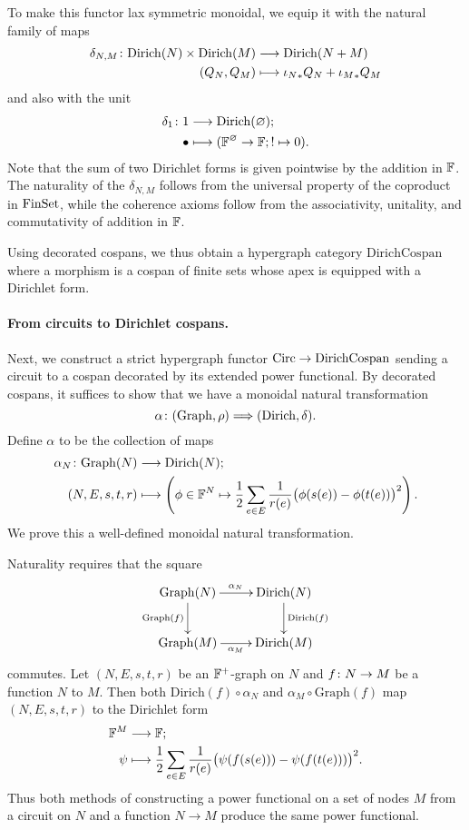 To make this functor lax symmetric monoidal, we equip it with the natural family of maps
\begin{align*}
  \delta_{N,M}{\colon} \mathrm{Dirich}(N) \times \mathrm{Dirich}(M) &\longrightarrow
  \mathrm{Dirich}(N+M) \\
  (Q_N,Q_M) &\longmapsto {\iota_N}_\ast Q_N+{\iota_M}_\ast Q_M
\end{align*}
and also with the unit
\begin{align*}
  \delta_1{\colon} 1 &\longrightarrow \mathrm{Dirich}(\varnothing);\\
  \bullet &\longmapsto ({\mathbb F}^\varnothing \to {\mathbb F}; ! \mapsto 0).
\end{align*}
Note that the sum of two Dirichlet forms is given pointwise by the addition in
${\mathbb F}$. The naturality of the $\delta_{N,M}$ follows from the universal property
of the coproduct in $\mathrm{FinSet}$, while the coherence axioms follow from the
associativity, unitality, and commutativity of addition in ${\mathbb F}$.

Using decorated cospans, we thus obtain a hypergraph category
$\mathrm{DirichCospan}$ where a morphism is a cospan of finite sets whose apex
is equipped with a Dirichlet form.  


\paragraph{From circuits to Dirichlet cospans.}
Next, we construct a strict hypergraph functor $\mathrm{Circ} \to \mathrm{DirichCospan}$
sending a circuit to a cospan decorated by its extended power functional. By
decorated cospans, it suffices to show that we have a monoidal natural
transformation 
\[
  \alpha{\colon} (\mathrm{Graph},\rho) \Longrightarrow
  (\mathrm{Dirich},\delta).
\]
Define $\alpha$ to be the collection of maps
\begin{align*}
  \alpha_N{\colon} \mathrm{Graph}(N) &\longrightarrow \mathrm{Dirich}(N); \\
  (N,E,s,t,r) &\longmapsto \left(\phi \in {\mathbb F}^N \mapsto \frac{1}{2} \sum_{e \in E}
  \frac{1}{r(e)}\big(\phi(s(e))-\phi(t(e))\big)^2\right).
\end{align*}
We prove this a well-defined monoidal natural transformation. 

Naturality requires that the square
\[
  \xymatrix{
    \mathrm{Graph}(N) \ar[r]^{\alpha_N} \ar[d]_{\mathrm{Graph}(f)} &
    \mathrm{Dirich}(N) \ar[d]^{\mathrm{Dirich}(f)}  \\
    \mathrm{Graph}(M) \ar[r]_{\alpha_M} & \mathrm{Dirich}(M)
  }
\]
commutes. Let $(N,E,s,t,r)$ be an ${\mathbb F}^+$-graph on $N$ and $f{\colon} N \to M$ be a
function $N$ to $M$. Then both $\mathrm{Dirich}(f) \circ \alpha_N$ and $\alpha_M
\circ \mathrm{Graph}(f)$ map $(N,E,s,t,r)$ to the Dirichlet form
\begin{align*}
  {\mathbb F}^M &\longrightarrow {\mathbb F};\\
  \psi &\longmapsto \frac{1}{2} \sum_{e \in E}\frac{1}{r(e)}
  \big(\psi(f(s(e)))-\psi(f(t(e)))\big)^2.
\end{align*}
Thus both methods of constructing a power functional on a set of nodes $M$ from
a circuit on $N$ and a function $N \to M$ produce the same power functional.

